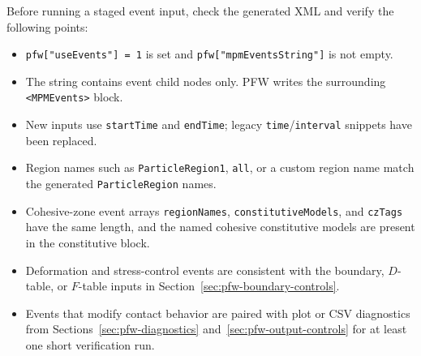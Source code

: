 Before running a staged event input, check the generated XML and verify the following points:
\begin{itemize}[leftmargin=*]
\item \texttt{pfw["useEvents"] = 1} is set and \texttt{pfw["mpmEventsString"]} is not empty.
\item The string contains event child nodes only.  PFW writes the surrounding \texttt{<MPMEvents>} block.
\item New inputs use \texttt{startTime} and \texttt{endTime}; legacy \texttt{time}/\texttt{interval} snippets have been replaced.
\item Region names such as \texttt{ParticleRegion1}, \texttt{all}, or a custom region name match the generated \texttt{ParticleRegion} names.
\item Cohesive-zone event arrays \texttt{regionNames}, \texttt{constitutiveModels}, and \texttt{czTags} have the same length, and the named cohesive constitutive models are present in the constitutive block.
\item Deformation and stress-control events are consistent with the boundary, \(D\)-table, or \(F\)-table inputs in Section~\ref{sec:pfw-boundary-controls}.
\item Events that modify contact behavior are paired with plot or CSV diagnostics from Sections~\ref{sec:pfw-diagnostics} and~\ref{sec:pfw-output-controls} for at least one short verification run.
\end{itemize}
